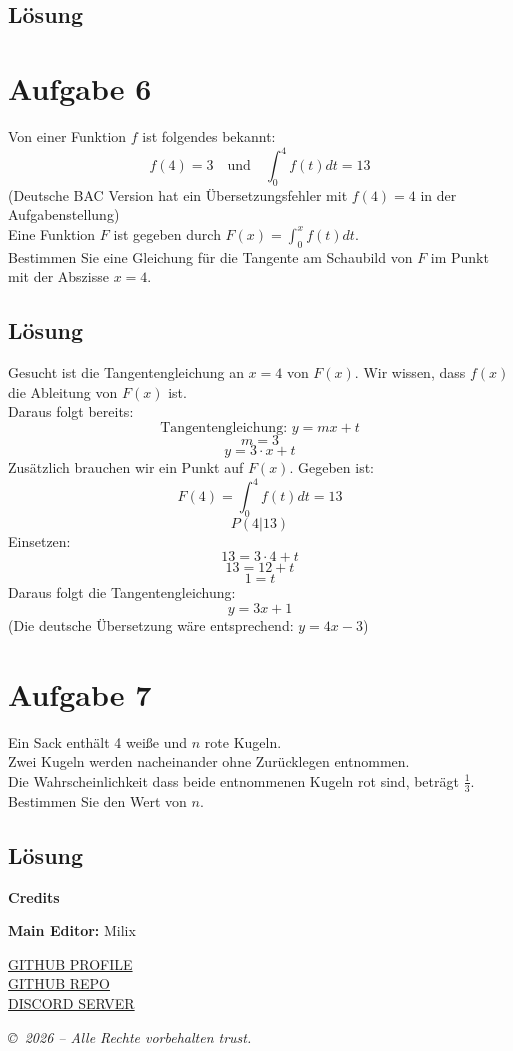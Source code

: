 \documentclass{article}
\begin{document}
\subsection*{Lösung}

\newpage
\section*{Aufgabe 6}
Von einer Funktion \(f\) ist folgendes bekannt:
\[f(4)=3\quad\text{und}\quad\int^4_0f(t)dt=13\]
(Deutsche BAC Version hat ein Übersetzungsfehler mit \(f(4)=4\) in der Aufgabenstellung) \\
Eine Funktion \(F\) ist gegeben durch \(F(x)=\int_{0}^{x}f(t)dt\). \\
Bestimmen Sie eine Gleichung für die Tangente am Schaubild von \(F\)
im Punkt mit der Abszisse \(x=4\).
\subsection*{Lösung}

Gesucht ist die Tangentengleichung an \(x=4\) von \(F(x)\). Wir wissen, dass \(f(x)\) die Ableitung von \(F(x)\) ist. \\
Daraus folgt bereits:
\[\text{Tangentengleichung: }y=mx+t\]
\[m=3\]
\[y=3\cdot x+t\]
Zusätzlich brauchen wir ein Punkt auf \(F(x)\). Gegeben ist:
\[F(4)=\int^4_0f(t)dt=13\]
\[P(4|13)\]
Einsetzen:
\[13=3\cdot 4+t\]
\[13=12+t\]
\[1=t\]
Daraus folgt die Tangentengleichung:
\[y=3x+1\]
(Die deutsche Übersetzung wäre entsprechend: \(y=4x-3\))

\newpage
\section*{Aufgabe 7}
Ein Sack enthält 4 weiße und \(n\) rote Kugeln. \\
Zwei Kugeln werden nacheinander ohne Zurücklegen entnommen. \\
Die Wahrscheinlichkeit dass beide entnommenen Kugeln rot sind,
beträgt \(\frac{1}{3}\). \\
Bestimmen Sie den Wert von \(n\).
\subsection*{Lösung}

\newpage
\begin{center}
    {\LARGE \textbf{Credits}}
\end{center}
\vspace{1cm}
\noindent\textbf{Main Editor: } Milix
\vspace{0.5cm}
\begin{center}
    \href{https://github.com/Milix244}{GITHUB PROFILE}  \\
    \vspace{0.3cm}
    \href{https://github.com/Milix244/Reserve-BAC-2017}{GITHUB REPO}  \\
    \vspace{0.3cm}
    \href{https://discord.gg/EpQ3eukxJ4}{DISCORD SERVER}
\end{center}
\vspace{1cm}
\textit{\copyright\ 2026 -- Alle Rechte vorbehalten trust.}
\end{document}
